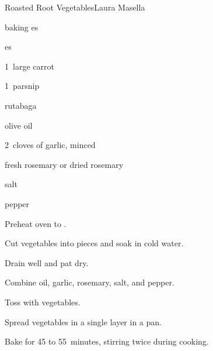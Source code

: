 \begin{recipe}{Roasted Root Vegetables}{Laura Masella}{}

\begin{ingredients}
\item {} baking es
\item {} es
\item 1~large carrot
\item 1~parsnip
\item \lbs{\quarter} rutabaga
\item \Tp{1\half} olive oil
\item 2~cloves of garlic, minced
\item {} fresh rosemary or  dried rosemary
\item \tp{\half} salt
\item \tp{\half} pepper
\end{ingredients}

\begin{directions}
\item Preheat oven to .
\item Cut vegetables into \inch{1\half} pieces and soak in cold water.
\item Drain well and pat dry.
\item Combine oil, garlic, rosemary, salt, and pepper.
\item Toss with vegetables.
\item Spread vegetables in a single layer in a pan.
\item Bake for 45 to 55~minutes, stirring twice during cooking.
\end{directions}

\end{recipe}

